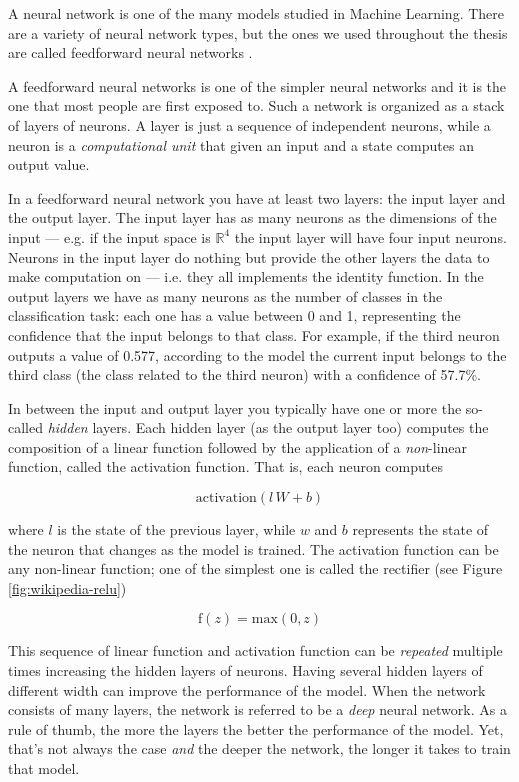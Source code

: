 A neural network is one of the many models studied in Machine Learning.
There are a variety of neural network types, but the ones we used
throughout the thesis are called feedforward neural
networks \cite{Goodfellow-et-al-2016}.

A feedforward neural networks is one of the simpler neural networks and
it is the one that most people are first exposed to. Such a network is
organized as a stack of layers of neurons. A layer is just a sequence
of independent neurons, while a neuron is a \emph{computational unit}
that given an input and a state computes an output value.

In a feedforward neural network you have at least two layers: the input
layer and the output layer. The input layer has as many neurons as the
dimensions of the input --- e.g. if the input space is $\mathbb{R}^4$
the input layer will have four input neurons. Neurons in the input
layer do nothing but provide the other layers the data to make
computation on --- i.e. they all implements the identity function.
In the output layers we have as many neurons as the number of
classes in the classification task: each one has a value between 0 and
1, representing the confidence that the input belongs to that class.
For example, if the third neuron outputs a value of 0.577, according to
the model the current input belongs to the third class (the class
related to the third neuron) with a confidence of 57.7\%.

In between the input and output layer you typically have one or more
the so-called \emph{hidden} layers. Each hidden layer (as the output
layer too) computes the composition of a linear function followed by
the application of a \emph{non}-linear function, called the activation
function. That is, each neuron computes

\[ \text{activation}(l \, W + b) \]

where $l$ is the state of the previous layer, while $w$ and $b$
represents the state of the neuron that changes as the model is
trained. The activation function can be any non-linear function; one of
the simplest one is called the rectifier (see Figure
\ref{fig:wikipedia-relu})

\[ \text{f}(z) = \text{max}(0, z) \]

This sequence of linear function and activation function can be
\emph{repeated} multiple times increasing the hidden layers of neurons.
Having several hidden layers of different width can improve the
performance of the model. When the network consists of many layers, the
network is referred to be a \emph{deep} neural network. As a rule of
thumb, the more the layers the better the performance of the model.
Yet, that's not always the case \emph{and} the deeper the network, the
longer it takes to train that model.

